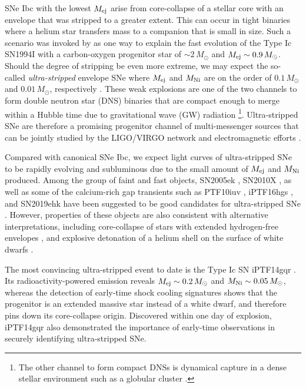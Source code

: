 \documentclass[twocolumn]{aastex63}
\begin{document}
\begin{CJK*}{UTF8}{gbsn}
SNe Ibc with the lowest $M_{\rm ej}$ arise from core-collapse of a stellar core with an envelope that 
was stripped to a greater extent. This can occur in tight binaries where a helium star transfers 
mass to a companion that is small in size. Such a scenario was invoked by \citet{Nomoto1994} as one
way to explain the fast evolution of the Type Ic SN1994I with a carbon-oxygen progenitor star of $\sim 
2\,M_\odot$ and $M_{\rm ej }\sim 0.9\, M_\odot$. Should the degree of stripping be even more extreme, 
we may expect the so-called \textit{ultra-stripped} envelope SNe where $M_{\rm ej}$ and $M_{\rm Ni} $ 
are on the order of $0.1 \, M_\odot$ and $0.01 \, M_\odot$, respectively \citep{Tauris2013,Tauris2015, 
Suwa2015}. These weak explosions are one of the two channels to form double neutron 
star (DNS) binaries that are compact enough to merge within a Hubble 
time due to gravitational wave (GW) radiation \citep{Tauris2017}\footnote{The other channel to 
	form compact DNSs is dynamical capture in a dense stellar environment 
	such as a globular cluster \citep{East2012, Andrews2019}.}. Ultra-stripped SNe are therefore 
a promising progenitor channel of multi-messenger sources that can be  jointly studied 
by the LIGO/VIRGO network and electromagnetic efforts \citep{GW170817, MMA, Goldstein2017, 
Coulter17, Hallinan17, Kasliwal2017}.

Compared with canonical SNe Ibc, we expect light curves of ultra-stripped SNe to be rapidly evolving 
and subluminous due to the small amount of $M_{\rm ej}$ and $M_{\rm Ni}$ produced. Among the 
group of faint and fast objects, SN2005ek \citep{Drout2013}, SN2010X \citep{Kasliwal2010}, as well as 
some of the calcium-rich gap transients such as PTF10iuv \citep{Kasliwal2012}, iPTF16hgs 
\citep{DeKC2018}, and SN2019ehk \citep{Nakaoka2020} have been suggested to be good candidates 
for ultra-stripped SNe \citep{Moriya2017}. However, properties of these objects are also consistent 
with alternative interpretations, including core-collapse of stars with extended hydrogen-free envelopes
\citep{Kleiser2014, KleiserFuller2018, KleiserKasen2018}, and explosive detonation of a helium shell on 
the surface of white dwarfs \citep{Shen2010, Sim2012, Polin2019, De2020b, Jacobson-Galan2020}.

The most convincing ultra-stripped event to date is the Type Ic SN iPTF14gqr \citep{De2018}. Its 
radioactivity-powered emission reveals $M_{\rm ej}\sim 0.2\, M_\odot$ and $M_{\rm Ni}\sim 
0.05\,M_\odot$, whereas the detection of early-time shock cooling signatures shows that the 
progenitor is an extended massive star instead of a white dwarf, and therefore pins down its 
core-collapse origin. Discovered within one day of explosion, iPTF14gqr also demonstrated the 
importance of early-time observations in securely identifying ultra-stripped SNe. 


\end{CJK*}
\end{document}
